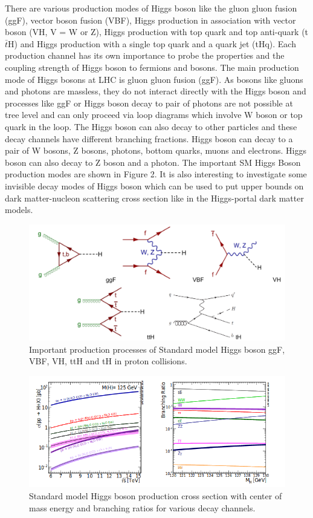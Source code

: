 \documentclass[final,3p]{CSP}
\begin{document}
 \newpage

There are various production modes of Higgs boson like the gluon gluon fusion (ggF), vector boson fusion (VBF), Higgs 
production in association with vector boson (VH, V = W or Z), Higgs production with top quark and top anti-quark (t$\bar{t}$H) and Higgs 
production with a single top quark and a quark jet (tHq). Each production channel has its own importance to probe the 
properties and the coupling strength of Higgs boson to fermions and bosons. The main production mode of Higgs bosons at LHC is 
gluon gluon fusion (ggF). As bosons like gluons and photons are massless, they do not interact directly with the Higgs boson 
and processes like ggF or Higgs boson decay to pair of photons are not possible at tree level and can only proceed via loop 
diagrams which involve W boson or top quark in the loop. The Higgs boson can also decay to other particles and these decay 
channels have different branching fractions. Higgs boson can decay to a pair of W bosons, Z bosons, photons, bottom quarks, 
muons and electrons. Higgs boson can also decay to Z boson and a photon. The important SM Higgs Boson production modes are shown in Figure 2. It is also interesting to investigate some invisible 
decay modes of Higgs boson which can be used to put upper bounds on dark matter-nucleon scattering cross section like in the 
Higgs-portal dark matter models.\\

\begin{figure}[H]
	\centering
	\includegraphics[width=\columnwidth]{./pg.png}
	\caption{Important production processes of Standard model Higgs boson ggF, VBF, VH, ttH and tH in proton collisions.}
	\label{figure 2}
\end{figure}


\begin{figure}[H]
  \centering
   \includegraphics[scale=0.5]{./cd2.png}
  \caption{Standard model Higgs boson production cross section with center of mass energy and branching ratios for various decay channels.}
   \label{figure 3}
\end{figure}
\newpage
\end{document}
